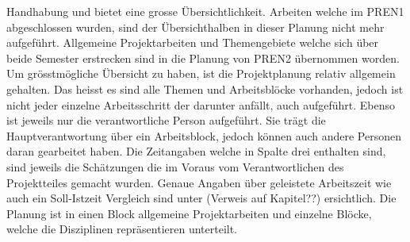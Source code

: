 Handhabung und bietet eine grosse Übersichtlichkeit. Arbeiten welche im PREN1 
abgeschlossen wurden, sind der Übersichthalben in dieser Planung nicht mehr 
aufgeführt. Allgemeine Projektarbeiten und Themengebiete welche sich über beide 
Semester erstrecken sind in die Planung von PREN2 übernommen worden. Um 
grösstmögliche Übersicht zu haben, ist die Projektplanung relativ allgemein 
gehalten. Das heisst es sind alle Themen und Arbeitsblöcke vorhanden, jedoch 
ist nicht jeder einzelne Arbeitsschritt der darunter anfällt, auch aufgeführt. 
Ebenso ist jeweils nur die verantwortliche Person aufgeführt. Sie trägt die Hauptverantwortung über ein Arbeitsblock, jedoch können auch andere Personen 
daran gearbeitet haben. Die Zeitangaben welche in Spalte drei enthalten sind, 
sind jeweils die Schätzungen die im Voraus vom Verantwortlichen des Projektteiles 
gemacht wurden. Genaue Angaben über geleistete Arbeitszeit wie auch ein 
Soll-Istzeit Vergleich sind unter (Verweis auf Kapitel??) ersichtlich. Die Planung 
ist in einen Block allgemeine Projektarbeiten und einzelne Blöcke, welche die 
Disziplinen repräsentieren unterteilt.
